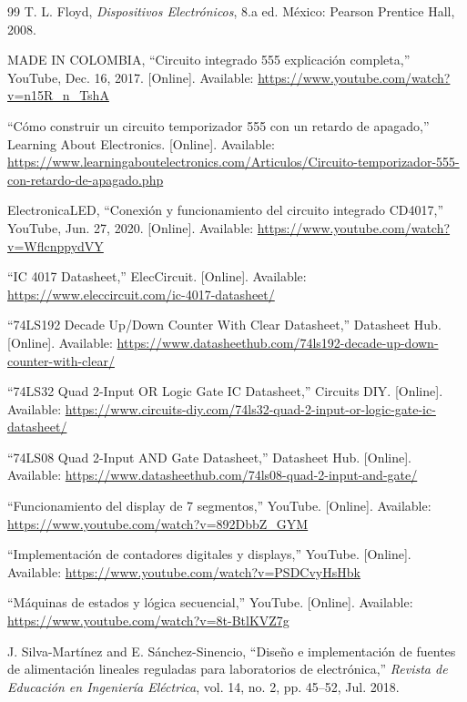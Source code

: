 \documentclass[12pt, journal, onecolumn]{IEEEtran}
\begin{document}
\begin{thebibliography}{99}
T. L. Floyd, \textit{Dispositivos Electrónicos}, 8.a ed. México: Pearson Prentice Hall, 2008.

MADE IN COLOMBIA, ``Circuito integrado 555 explicación completa,'' YouTube, Dec. 16, 2017. [Online]. Available: \url{https://www.youtube.com/watch?v=n15R_n_TshA}

``Cómo construir un circuito temporizador 555 con un retardo de apagado,'' Learning About Electronics. [Online]. Available: \url{https://www.learningaboutelectronics.com/Articulos/Circuito-temporizador-555-con-retardo-de-apagado.php}

ElectronicaLED, ``Conexión y funcionamiento del circuito integrado CD4017,'' YouTube, Jun. 27, 2020. [Online]. Available: \url{https://www.youtube.com/watch?v=WflcnppydVY}

``IC 4017 Datasheet,'' ElecCircuit. [Online]. Available: \url{https://www.eleccircuit.com/ic-4017-datasheet/}

``74LS192 Decade Up/Down Counter With Clear Datasheet,'' Datasheet Hub. [Online]. Available: \url{https://www.datasheethub.com/74ls192-decade-up-down-counter-with-clear/}

``74LS32 Quad 2-Input OR Logic Gate IC Datasheet,'' Circuits DIY. [Online]. Available: \url{https://www.circuits-diy.com/74ls32-quad-2-input-or-logic-gate-ic-datasheet/}

``74LS08 Quad 2-Input AND Gate Datasheet,'' Datasheet Hub. [Online]. Available: \url{https://www.datasheethub.com/74ls08-quad-2-input-and-gate/}

``Funcionamiento del display de 7 segmentos,'' YouTube. [Online]. Available: \url{https://www.youtube.com/watch?v=892DbbZ_GYM}

``Implementación de contadores digitales y displays,'' YouTube. [Online]. Available: \url{https://www.youtube.com/watch?v=PSDCvyHsHbk}

``Máquinas de estados y lógica secuencial,'' YouTube. [Online]. Available: \url{https://www.youtube.com/watch?v=8t-BtlKVZ7g}

J. Silva-Martínez and E. Sánchez-Sinencio, ``Diseño e implementación de fuentes de alimentación lineales reguladas para laboratorios de electrónica,'' \textit{Revista de Educación en Ingeniería Eléctrica}, vol. 14, no. 2, pp. 45--52, Jul. 2018.


\end{thebibliography}
\end{document}
